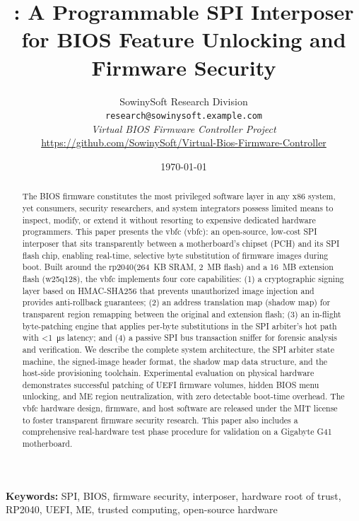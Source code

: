 \documentclass[11pt,a4paper,oneside]{article}
\title{
  \vbfc: A Programmable \ac{SPI} Interposer for \ac{BIOS} Feature Unlocking and Firmware Security
}
\author{
  SowinySoft Research Division\\
  \texttt{research@sowinysoft.example.com}\\
  \textit{Virtual BIOS Firmware Controller Project}\\
  \url{https://github.com/SowinySoft/Virtual-Bios-Firmware-Controller}
}
\date{\today}
\newcommand{\vbfc}{\gls{vbfc}\xspace}
\newcommand{\rp}{\gls{rp2040}\xspace}
\newcommand{\wq}{\gls{w25q128}\xspace}
\begin{document}
\maketitle

\begin{abstract}
The \ac{BIOS} firmware constitutes the most privileged software layer in any x86 system, yet consumers, security researchers, and system integrators possess limited means to inspect, modify, or extend it without resorting to expensive dedicated hardware programmers. This paper presents the \acf{vbfc} (\vbfc): an open-source, low-cost \ac{SPI} interposer that sits transparently between a motherboard's chipset (\ac{PCH}) and its \ac{SPI} flash chip, enabling real-time, selective byte substitution of firmware images during boot. Built around the \rp (\SI{264}{KB} \ac{SRAM}, \SI{2}{MB} flash) and a \SI{16}{MB} extension flash (\wq), the \vbfc implements four core capabilities: (1) a cryptographic signing layer based on \ac{HMAC}-\ac{SHA}256 that prevents unauthorized image injection and provides anti-rollback guarantees; (2) an address translation map (shadow map) for transparent region remapping between the original and extension flash; (3) an in-flight byte-patching engine that applies per-byte substitutions in the \ac{SPI} arbiter's hot path with \SI{<1}{\micro s} latency; and (4) a passive \ac{SPI} bus transaction sniffer for forensic analysis and verification. We describe the complete system architecture, the \ac{SPI} arbiter state machine, the signed-image header format, the shadow map data structure, and the host-side provisioning toolchain. Experimental evaluation on physical hardware demonstrates successful patching of \ac{UEFI} firmware volumes, hidden \ac{BIOS} menu unlocking, and \ac{ME} region neutralization, with zero detectable boot-time overhead. The \vbfc hardware design, firmware, and host software are released under the MIT license to foster transparent firmware security research. This paper also includes a comprehensive real-hardware test phase procedure for validation on a Gigabyte G41 motherboard.
\end{abstract}

\textbf{Keywords:} \ac{SPI}, \ac{BIOS}, firmware security, interposer, hardware root of trust, \ac{RP2040}, \ac{UEFI}, \ac{ME}, trusted computing, open-source hardware

\tableofcontents
\newpage
\end{document}
